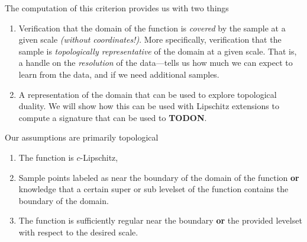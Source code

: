 The computation of this criterion provides us with two things
\begin{enumerate}
  \item Verification that the domain of the function is \emph{covered} by the sample at a given scale \emph{(without coordinates!)}.
    More specifically, verification that the sample is \emph{topologically representative} of the domain at a given scale.
    That is, a handle on the \emph{resolution} of the data---tells us how much we can expect to learn from the data, and if we need additional samples.
  \item A representation of the domain that can be used to explore topological duality.
    We will show how this can be used with Lipschitz extensions to compute a signature that can be used to \textbf{TODON}.
\end{enumerate}

Our assumptions are primarily topological
\begin{enumerate}
  \item The function is $c$-Lipschitz,
  \item Sample points labeled as near the boundary of the domain of the function \textbf{or} knowledge that a certain super or sub levelset of the function contains the boundary of the domain.
  \item The function is sufficiently regular near the boundary \textbf{or} the provided levelset with respect to the desired scale.
\end{enumerate}
